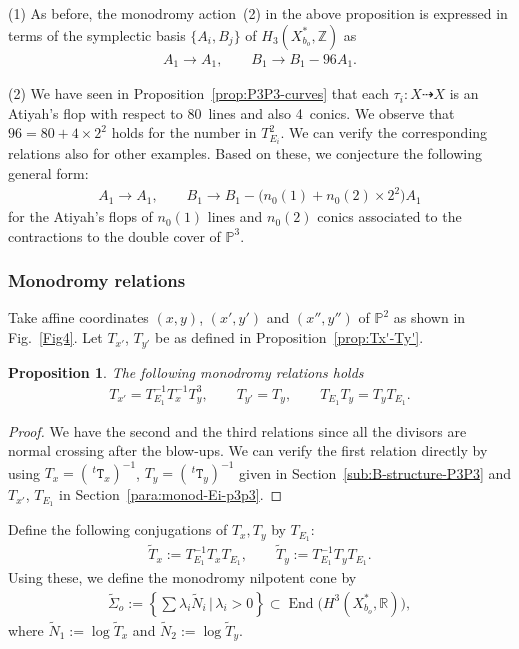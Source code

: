 \documentclass[pdftex]{sigma}
\numberwithin{equation}{section}
\newtheorem{Proposition}[Theorem]{Proposition}
\begin{document}
\begin{Remark} \label{rem:Remark-TE1-II}(1) As before, the monodromy action~(2) in the above proposition is expressed in terms of the symplectic basis $\{ A_{i},B_{j}\} $ of $H_{3}(X_{b_{o}}^{*},\mathbb{Z})$ as
\begin{gather*}
A_{1}\to A_{1},\qquad B_{1}\to B_{1}-96 A_{1}.
\end{gather*}

(2) We have seen in Proposition~\ref{prop:P3P3-curves} that each $\tau_{i}\colon X\dashrightarrow X$ is an Atiyah's flop with respect to 80~lines and also 4~conics. We observe that $96=80+4\times2^{2}$ holds for the number in $T_{E_{i}}^{2}$. We can verify the corresponding relations also for other examples. Based on these, we conjecture the following general form:
\begin{gather*}
A_{1}\to A_{1},\qquad B_{1}\to B_{1}-\big(n_{0}(1)+n_{0}(2)\times2^{2}\big) A_{1}
\end{gather*}
for the Atiyah's flops of $n_{0}(1)$ lines and $n_{0}(2)$ conics associated to the contractions to the double cover of $\mathbb{P}^{3}$.
\end{Remark}

\subsubsection{Monodromy relations}
Take affine coordinates $(x,y)$, $(x',y')$ and $(x'',y'')$ of $\mathbb{P}^{2}$ as shown in Fig.~\ref{Fig4}. Let $T_{x'}$, $T_{y'}$ be as defined in Proposition~\ref{prop:Tx'-Ty'}.
\begin{Proposition} \label{prop:Monod-rel-P3P3}The following monodromy relations holds
\begin{gather}
\boxed{T_{x'}=T_{E_{1}}^{-1}T_{x}^{-1}T_{y}^{3},\qquad T_{y'}=T_{y},\qquad T_{E_{1}}T_{y}=T_{y}T_{E_{1}}.}\label{eq:XP3P3-monod-rel-1}
\end{gather}
\end{Proposition}
\begin{proof} We have the second and the third relations since all the divisors are normal crossing after the blow-ups. We can verify the first relation directly by using $T_{x}=(\,^{t}\mathtt{T}_{x})^{-1}$, $T_{y}=(\,^{t}\mathtt{T}_{y})^{-1}$ given in Section~\ref{sub:B-structure-P3P3} and $T_{x'}$, $T_{E_{1}}$ in Section~\ref{para:monod-Ei-p3p3}.
\end{proof}

\begin{Definition}
Define the following conjugations of $T_{x},T_{y}$ by $T_{E_{1}}$:
\begin{gather*}
\tilde{T}_{x}:=T_{E_{1}}^{-1}T_{x}T_{E_{1}},\qquad \tilde{T}_{y}:=T_{E_{1}}^{-1}T_{y}T_{E_{1}}.
\end{gather*}
Using these, we define the monodromy nilpotent cone by
\begin{gather*}
\tilde{\Sigma}_{o}:=\left\{ \sum\lambda_{i}\tilde{N}_{i}\,|\,\lambda_{i}>0\right\} \subset\operatorname{End}\big(H^{3}(X_{b_{o}}^{*},\mathbb{R})\big),
\end{gather*}
where $\tilde{N}_{1}:=\log\tilde{T}_{x}$ and $\tilde{N}_{2}:=\log\tilde{T}_{y}$.
\end{Definition}
\end{document}
